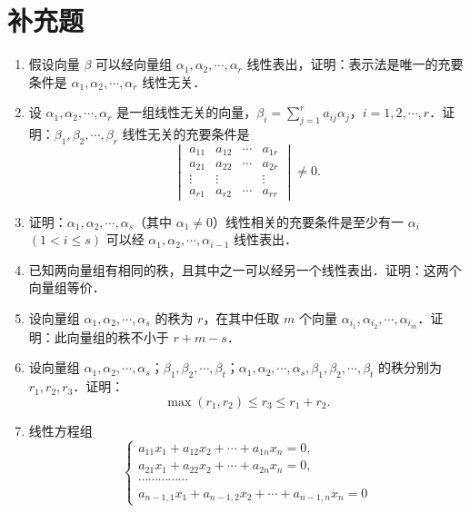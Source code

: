 \section{补充题}

\begin{enumerate}
  \item 假设向量 $\beta$ 可以经向量组 $\alpha_1,\alpha_2,\cdots,\alpha_r$ 线性表出，证明：表示法是唯一的充要条件是 $\alpha_1,\alpha_2,\cdots,\alpha_r$ 线性无关．
  \ansproof
  \item 设 $\alpha_1,\alpha_2,\cdots,\alpha_r$ 是一组线性无关的向量，$\beta_i=\sum\limits_{j=1}^{r}a_{ij}\alpha_j$，$i=1,2,\cdots,r$．证明：$\beta_1,\beta_2,\cdots,\beta_r$ 线性无关的充要条件是
  \[
    \begin{vmatrix}
      a_{11}&a_{12}&\cdots&a_{1r}\\
      a_{21}&a_{22}&\cdots&a_{2r}\\
      \vdots&\vdots&&\vdots\\
      a_{r1}&a_{r2}&\cdots&a_{rr}
    \end{vmatrix}\ne 0.
  \]
  \ansproof
  \item 证明：$\alpha_1,\alpha_2,\cdots,\alpha_s$（其中 $\alpha_1\ne 0$）线性相关的充要条件是至少有一 $\alpha_i$ $(1<i\le s)$ 可以经 $\alpha_1,\alpha_2,\cdots,\alpha_{i-1}$ 线性表出．
  \ansproof
  \item 已知两向量组有相同的秩，且其中之一可以经另一个线性表出．证明：这两个向量组等价．
  \ansproof
  \item 设向量组 $\alpha_1,\alpha_2,\cdots,\alpha_s$ 的秩为 $r$，在其中任取 $m$ 个向量 $\alpha_{i_1},\alpha_{i_2},\cdots,\alpha_{i_m}$．证明：此向量组的秩不小于 $r+m-s$．
  \ansproof
  \item 设向量组 $\alpha_1,\allowbreak \alpha_2,\allowbreak \cdots,\allowbreak \alpha_s$；$\beta_1,\allowbreak \beta_2,\allowbreak \cdots,\allowbreak \beta_t$；$\alpha_1,\allowbreak \alpha_2,\allowbreak \cdots,\allowbreak \alpha_s,\allowbreak \beta_1,\allowbreak \beta_2,\allowbreak \cdots,\allowbreak \beta_t$ 的秩分别为 $r_1,\allowbreak r_2,\allowbreak r_3$．证明：
  \[
    \max(r_1,r_2)\le r_3\le r_1+r_2.
  \]
  \ansproof
  \item 线性方程组
  \[
    \begin{cases}
      a_{11}x_1+a_{12}x_2+\cdots+a_{1n}x_n=0,\\
      a_{21}x_1+a_{22}x_2+\cdots+a_{2n}x_n=0,\\
      \cdots\cdots\cdots\cdots\cdots\\
      a_{n-1,1}x_1+a_{n-1,2}x_2+\cdots+a_{n-1,n}x_n=0

\end{cases}\]
\end{enumerate}
